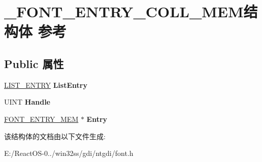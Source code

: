 \hypertarget{struct___f_o_n_t___e_n_t_r_y___c_o_l_l___m_e_m}{}\section{\+\_\+\+F\+O\+N\+T\+\_\+\+E\+N\+T\+R\+Y\+\_\+\+C\+O\+L\+L\+\_\+\+M\+E\+M结构体 参考}
\label{struct___f_o_n_t___e_n_t_r_y___c_o_l_l___m_e_m}
\subsection*{Public 属性}
\begin{DoxyCompactItemize}
\item 
\mbox{\label{struct___f_o_n_t___e_n_t_r_y___c_o_l_l___m_e_m_a7957839cf06be1648a58db865d734f4d}} 
\hyperlink{struct___l_i_s_t___e_n_t_r_y}{L\+I\+S\+T\+\_\+\+E\+N\+T\+RY} {\bfseries List\+Entry}
\item 
\mbox{\label{struct___f_o_n_t___e_n_t_r_y___c_o_l_l___m_e_m_aac3a96e9bcef953f83b20d5389b05c97}} 
U\+I\+NT {\bfseries Handle}
\item 
\mbox{\label{struct___f_o_n_t___e_n_t_r_y___c_o_l_l___m_e_m_a64160bfaf4138c06afe39bc37f784e54}} 
\hyperlink{struct___f_o_n_t___e_n_t_r_y___m_e_m}{F\+O\+N\+T\+\_\+\+E\+N\+T\+R\+Y\+\_\+\+M\+EM} $\ast$ {\bfseries Entry}
\end{DoxyCompactItemize}


该结构体的文档由以下文件生成\+:\begin{DoxyCompactItemize}
\item 
E\+:/\+React\+O\+S-\/0../win32ss/gdi/ntgdi/font.\+h\end{DoxyCompactItemize}
